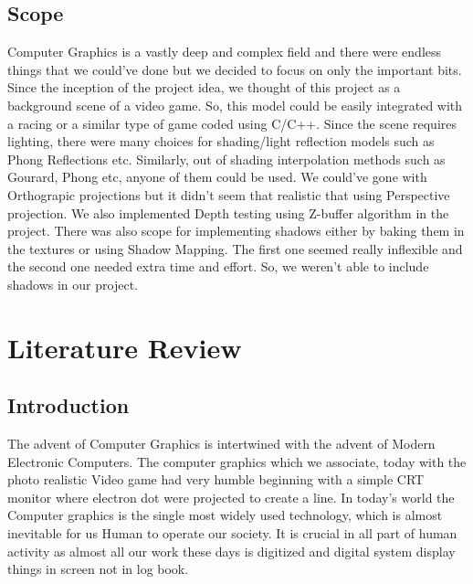 \documentclass{report}
\begin{document}
\subsection{Scope}
    Computer Graphics is a vastly deep and complex field and there were endless things that we could've done 
    but we decided to focus on only the important bits. Since the inception of the project idea, we thought of 
    this project as a background scene of a video game. So, this model could be easily integrated with a racing 
    or a similar type of game coded using C/C++. Since the scene requires lighting, there were many choices for 
    shading/light reflection models such as Phong Reflections etc. Similarly, out of shading interpolation methods such as 
    Gourard, Phong etc, anyone of them could be used. We could've gone with Orthograpic projections but it 
    didn't seem that realistic that using Perspective projection. We also implemented Depth testing using 
    Z-buffer algorithm in the project. There was also scope for implementing shadows either by baking them 
    in the textures or using Shadow Mapping. The first one seemed really inflexible and the second one needed 
    extra time and effort. So, we weren't able to include shadows in our project.

\section{Literature Review}
\subsection{Introduction}
The advent of Computer Graphics is intertwined with the advent of Modern Electronic Computers. The computer graphics which
we associate, today with the photo realistic Video game had very humble beginning with a simple CRT monitor where electron dot were
projected to create a line. In today's world the Computer graphics is the single most widely used technology, which is almost inevitable for us Human
to operate our society. It is crucial in all part of human activity as almost all our work these days is digitized and digital system
display things in screen not in log book.
\end{document}
